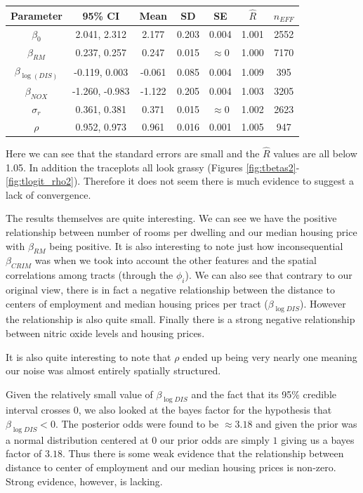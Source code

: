 \documentclass[11pt]{article}
\begin{document}
\begin{center}
\begin{tabular}{ c  | c | c | c | c | c | c}
\hline
 Parameter & 95\% CI & Mean & SD & SE & $\hat{R}$ & $n_{EFF}$ \\ 
 \hline
 $\beta_0$ & 2.041,  2.312 & 2.177 & 0.203 & 0.004 & 1.001 & 2552 \\
 $\beta_{RM}$ & 0.237, 0.257 & 0.247 & 0.015 & $\approx 0$ & 1.000 & 7170 \\
 $\beta_{\log{(DIS)}}$ & -0.119, 0.003 & -0.061 & 0.085 & 0.004 & 1.009 & 395 \\
 $\beta_{NOX}$ & -1.260, -0.983 & -1.122 & 0.205 & 0.004 & 1.003 & 3205 \\
 $\sigma_r$ & 0.361, 0.381 & 0.371 & 0.015 & $\approx 0$ & 1.002 & 2623 \\
 $\rho$ & 0.952, 0.973 & 0.961 & 0.016 & 0.001 & 1.005 & 947 \\
 \hline
\end{tabular}
\end{center}

Here we can see that the standard errors are small and the $\hat{R}$ values are all below 1.05. In addition the traceplots all look grassy (Figures \ref{fig:tbetas2}-\ref{fig:tlogit_rho2}). Therefore it does not seem there is much evidence to suggest a lack of convergence. \newline

The results themselves are quite interesting. We can see we have the positive relationship between number of rooms per dwelling and our median housing price with $\beta_{RM}$ being positive. It is also interesting to note just how inconsequential $\beta_{CRIM}$ was when we took into account the other features and the spatial correlations among tracts (through the $\phi_i$). We can also see that contrary to our original view, there is in fact a negative relationship between the distance to centers of employment and median housing prices per tract ($\beta_{\log{DIS}}$). However the relationship is also quite small. Finally there is a strong negative relationship between nitric oxide levels and housing prices. 

It is also quite interesting to note that $\rho$ ended up being very nearly one meaning our noise was almost entirely spatially structured. \newline

Given the relatively small value of $\beta_{\log{DIS}}$ and the fact that its 95\% credible interval crosses 0, we also looked at the bayes factor for the hypothesis that $\beta_{\log{DIS}}<0$. The posterior odds were found to be $\approx 3.18$ and given the prior was a normal distribution centered at 0 our prior odds are simply $1$ giving us a bayes factor of $3.18$. Thus there is some weak evidence that the relationship between distance to center of employment and our median housing prices is non-zero. Strong evidence, however, is lacking. \newline
\end{document}
